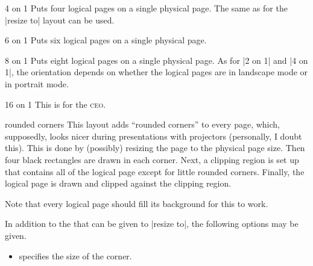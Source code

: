 \begin{pgflayout}{4 on 1}
    Puts four logical pages on a single physical page. The same 
    as for the |resize to| layout can be used.
\end{pgflayout}

\begin{pgflayout}{6 on 1}
    Puts six logical pages on a single physical page.
\end{pgflayout}

\begin{pgflayout}{8 on 1}
    Puts eight logical pages on a single physical page. As for |2 on 1| and
    |4 on 1|, the orientation depends on whether the logical pages are in
    landscape mode or in portrait mode.
\end{pgflayout}

\begin{pgflayout}{16 on 1}
    This is for the \textsc{ceo}.
\end{pgflayout}

\begin{pgflayout}{rounded corners}
\label{layout-rounded-corners}
    This layout adds ``rounded corners'' to every page, which, supposedly,
    looks nicer during presentations with projectors (personally, I doubt
    this). This is done by (possibly) resizing the page to the physical page
    size. Then four black rectangles are drawn in each corner. Next, a clipping
    region is set up that contains all of the logical page except for little
    rounded corners. Finally, the logical page is drawn and clipped against the
    clipping region.

    Note that every logical page should fill its background for this to work.

    In addition to the  that can be given to |resize to|, the
    following options may be given.
    \begin{itemize}
        \item {} specifies the size of the
            corner.
    \end{itemize}
\end{pgflayout}

